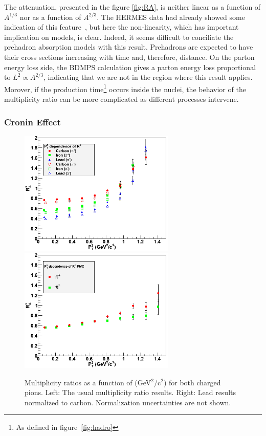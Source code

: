 The attenuation, presented in the figure \ref{fig:RA}, is neither linear as a 
function of $A^{1/3}$ nor as a function of $A^{2/3}$. The HERMES data had
already showed some indication 
of this feature~\cite{Airapetian:2007vu,Airapetian:2009jy}, but here the 
non-linearity, which has important implication on models, is clear. Indeed, 
it seems difficult to conciliate the prehadron absorption models with this result. Prehadrons 
are expected to have their cross sections increasing with time and, therefore, 
distance. On the parton energy loss side, the BDMPS calculation gives a parton 
energy loss proportional to $L^2 \propto A^{2/3}$, indicating that we are not
in the region where this result applies. Morover, if the production 
time\footnote{As defined in figure~\ref{fig:hadro}} occurs 
inside the nuclei, the behavior of the multiplicity ratio can be more complicated
as different processes intervene.

\subsubsection{Cronin Effect}

\begin{figure}[p]
\centering
\includegraphics[width=7.4cm] {chap6-fig/F_RvPt.png} 
\includegraphics[width=7.4cm] {chap6-fig/F_RvPt_PbC.png} 
\caption {Multiplicity ratios as a function of \pt (GeV$^2$/c$^2$) for both charged pions. Left: The usual multiplicity ratio results. Right: Lead results normalized to carbon. Normalization uncertainties are not shown.}
\label{fig:RPt}
\end{figure}

